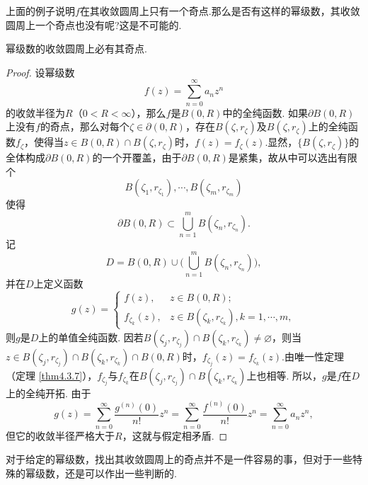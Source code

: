 上面的例子说明$f$在其收敛圆周上只有一个奇点.那么是否有这样的幂级数，其收敛圆周上一个奇点也没有呢?这是不可能的.
\begin{theorem}\label{thm6.2.3}
  幂级数的收敛圆周上必有其奇点.
\end{theorem}
\begin{proof}
  设幂级数
  \[
    f(z) = \sum_{n=0}^\infty a_nz^n
  \]
  的收敛半径为$R$（$0<R<\infty$），那么$f$是$B(0,R)$中的全纯函数.
  如果$\partial B(0,R)$上没有$f$的奇点，那么对每个$\zeta\in\partial(0,R)$，存在$B(\zeta,r_\zeta)$及$B(\zeta,r_\zeta)$上的全纯函数$f_\zeta$，使得当$z\in B(0,R)\cap B(\zeta,r_\zeta)$时，$f(z)=f_\zeta(z)$.显然，$\{B(\zeta,r_\zeta)\}$的全体构成$\partial B(0,R)$的一个开覆盖，由于$\partial B(0,R)$是紧集，故从中可以选出有限个
  \[
    B(\zeta_1,r_{\zeta_1}),\cdots,B(\zeta_m,r_{\zeta_m})
  \]
  使得
  \[ 
    \partial B(0,R)\subset\bigcup_{n=1}^m B(\zeta_n,r_{\zeta_n}).
  \]
  记
  \[
    D = B(0,R)\cup\big(\bigcup_{n=1}^mB(\zeta_n,r_{\zeta_n})\big),
  \]
  并在$D$上定义函数
  \[  
    g(z) = \begin{cases}
      f(z), & z \in B(0,R);\\
      f_{\zeta_k}(z), & z\in B(\zeta_k,r_{\zeta_k}),k=1,\cdots,m,
     \end{cases}
  \]
  则$g$是$D$上的单值全纯函数. 因若$B(\zeta_j,r_{\zeta_j})\cap B(\zeta_k,r_{\zeta_k})
  \ne\varnothing$，则当$z\in B(\zeta_j,r_{\zeta_j})\cap B(\zeta_k,r_{\zeta_k})\cap B(0,R)$时，$f_{\zeta_j}(z)=f_{\zeta_k}(z)$.由唯一性定理（定理 \ref{thm4.3.7}），$f_{\zeta_j}$与$f_{\zeta_k}$在$B(\zeta_j,r_{\zeta_j})\cap B(\zeta_k,r_{\zeta_k})$上也相等. 所以，$g$是$f$在$D$上的全纯开拓. 由于
  \[
    g(z) = \sum_{n=0}^\infty \frac{g^{(n)}(0)}{n!}z^n = \sum_{n=0}^\infty
    \frac{f^{(n)}(0)}{n!}z^n=\sum_{n=0}^\infty a_nz^n,
  \]
  但它的收敛半径严格大于$R$，这就与假定相矛盾.
\end{proof}

对于给定的幂级数，找出其收敛圆周上的奇点并不是一件容易的事，但对于一些特殊的幂级数，还是可以作出一些判断的.

